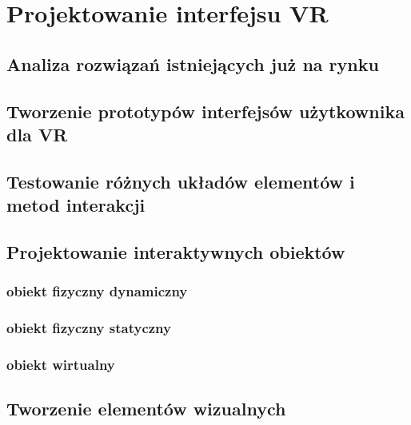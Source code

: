 \chapter{Projektowanie interfejsu VR}
\section{Analiza rozwiązań istniejących już na rynku}
\section{Tworzenie prototypów interfejsów użytkownika dla VR}

\section{Testowanie różnych układów elementów i metod interakcji}
\section{Projektowanie interaktywnych obiektów}
\subsection{obiekt fizyczny dynamiczny}
\subsection{obiekt fizyczny statyczny}
\subsection{obiekt wirtualny}
\section{Tworzenie elementów wizualnych}


